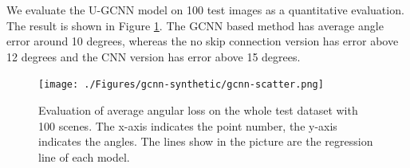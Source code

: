 \documentclass[border=15pt, multi, tikz]{article}
\begin{document}
We evaluate the U-GCNN model on 100 test images as a quantitative evaluation. The result is shown in Figure \ref{fig:scatter-gcnn}. The GCNN based method has average angle error around 10 degrees, whereas the no skip connection version has error above 12 degrees and the CNN version has error above 15 degrees.

\begin{figure}[h!]
	\centering
	\texttt{[image: ./Figures/gcnn-synthetic/gcnn-scatter.png]}
	\caption{Evaluation of average angular loss on the whole test dataset with 100 scenes. The x-axis indicates the point number, the y-axis indicates the angles. The lines show in the picture are the regression line of each model.}
	\label{fig:scatter-gcnn}
\end{figure}
\end{document}
